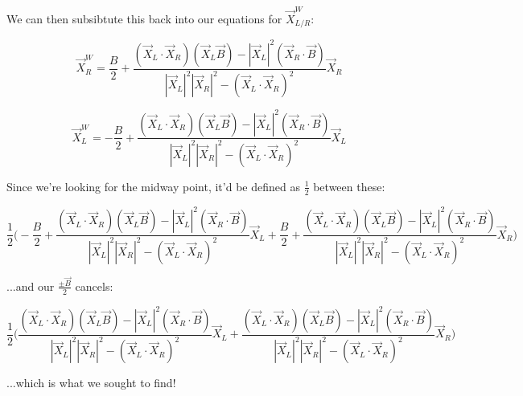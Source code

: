 \documentclass{article}
\begin{document}
\noindent We can then subsibtute this back into our equations for $\vec{X}^W_{L/R}$:

\begin{equation}
    \vec{X}_R^W = \frac{B}{2} + \frac{(\vec{X}_L\cdot\vec{X}_R)(\vec{X}_L\vec{B})-|\vec{X}_L|^2(\vec{X}_R\cdot\vec{B})}{|\vec{X}_L|^2|\vec{X}_R|^2-(\vec{X}_L\cdot\vec{X}_R)^2} \vec{X}_R
\end{equation}

\begin{equation}
    \vec{X}_L^W = -\frac{B}{2} + \frac{(\vec{X}_L\cdot\vec{X}_R)(\vec{X}_L\vec{B})-|\vec{X}_L|^2(\vec{X}_R\cdot\vec{B})}{|\vec{X}_L|^2|\vec{X}_R|^2-(\vec{X}_L\cdot\vec{X}_R)^2} \vec{X}_L
\end{equation}

\noindent Since we're looking for the midway point, it'd be defined as $\frac{1}{2}$ between these:

\begin{equation}
    \frac{1}{2}\biggl(
        -\frac{B}{2} + \frac{(\vec{X}_L\cdot\vec{X}_R)(\vec{X}_L\vec{B})-|\vec{X}_L|^2(\vec{X}_R\cdot\vec{B})}{|\vec{X}_L|^2|\vec{X}_R|^2-(\vec{X}_L\cdot\vec{X}_R)^2} \vec{X}_L + \frac{B}{2} + \frac{(\vec{X}_L\cdot\vec{X}_R)(\vec{X}_L\vec{B})-|\vec{X}_L|^2(\vec{X}_R\cdot\vec{B})}{|\vec{X}_L|^2|\vec{X}_R|^2-(\vec{X}_L\cdot\vec{X}_R)^2} \vec{X}_R
    \biggr)
\end{equation}

\noindent ...and our $\frac{\pm\vec{B}}{2}$ cancels:

\begin{equation}
    \frac{1}{2}\biggl(
        \frac{(\vec{X}_L\cdot\vec{X}_R)(\vec{X}_L\vec{B})-|\vec{X}_L|^2(\vec{X}_R\cdot\vec{B})}{|\vec{X}_L|^2|\vec{X}_R|^2-(\vec{X}_L\cdot\vec{X}_R)^2} \vec{X}_L + \frac{(\vec{X}_L\cdot\vec{X}_R)(\vec{X}_L\vec{B})-|\vec{X}_L|^2(\vec{X}_R\cdot\vec{B})}{|\vec{X}_L|^2|\vec{X}_R|^2-(\vec{X}_L\cdot\vec{X}_R)^2} \vec{X}_R
    \biggr)
\end{equation}

\noindent ...which is what we sought to find!
\end{document}
